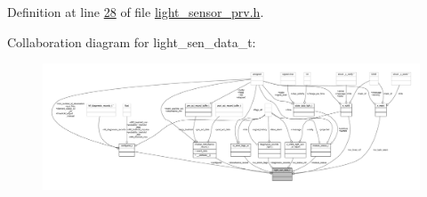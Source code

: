 Definition at line \hyperlink{a00024_source_l00028}{28} of file \hyperlink{a00024_source}{light\+\_\+sensor\+\_\+prv.\+h}.



Collaboration diagram for light\+\_\+sen\+\_\+data\+\_\+t\+:\nopagebreak
\begin{figure}[H]
\begin{center}
\leavevmode
\includegraphics[width=350pt]{d1/ddd/a00943}
\end{center}
\end{figure}

